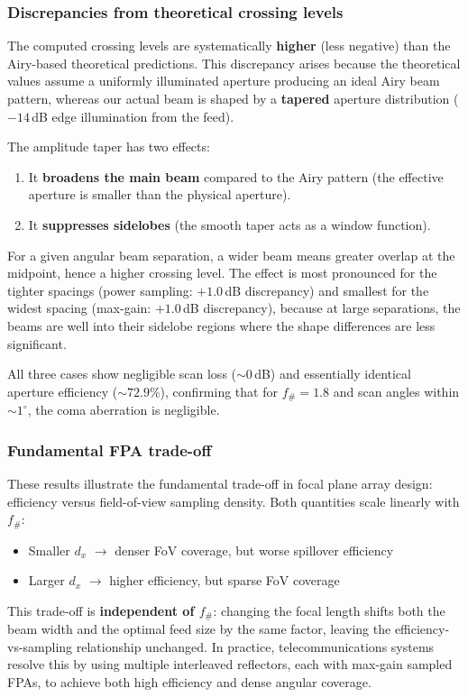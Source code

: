\documentclass{article}
\begin{document}
\subsubsection{Discrepancies from theoretical crossing levels}

The computed crossing levels are systematically \textbf{higher} (less negative) than the Airy-based theoretical predictions. This discrepancy arises because the theoretical values assume a uniformly illuminated aperture producing an ideal Airy beam pattern, whereas our actual beam is shaped by a \textbf{tapered} aperture distribution ($-14$\,dB edge illumination from the feed).

The amplitude taper has two effects:
\begin{enumerate}
\item It \textbf{broadens the main beam} compared to the Airy pattern (the effective aperture is smaller than the physical aperture).
\item It \textbf{suppresses sidelobes} (the smooth taper acts as a window function).
\end{enumerate}

For a given angular beam separation, a wider beam means greater overlap at the midpoint, hence a higher crossing level. The effect is most pronounced for the tighter spacings (power sampling: $+1.0$\,dB discrepancy) and smallest for the widest spacing (max-gain: $+1.0$\,dB discrepancy), because at large separations, the beams are well into their sidelobe regions where the shape differences are less significant.

All three cases show negligible scan loss (${\sim}0$\,dB) and essentially identical aperture efficiency (${\sim}72.9\%$), confirming that for $f_\# = 1.8$ and scan angles within ${\sim}1^\circ$, the coma aberration is negligible.

\subsubsection{Fundamental FPA trade-off}

These results illustrate the fundamental trade-off in focal plane array design: efficiency versus field-of-view sampling density. Both quantities scale linearly with $f_\#$:
\begin{itemize}
\item Smaller $d_x$ $\to$ denser FoV coverage, but worse spillover efficiency
\item Larger $d_x$ $\to$ higher efficiency, but sparse FoV coverage
\end{itemize}
This trade-off is \textbf{independent of $f_\#$}: changing the focal length shifts both the beam width and the optimal feed size by the same factor, leaving the efficiency-vs-sampling relationship unchanged. In practice, telecommunications systems resolve this by using multiple interleaved reflectors, each with max-gain sampled FPAs, to achieve both high efficiency and dense angular coverage.
\end{document}
